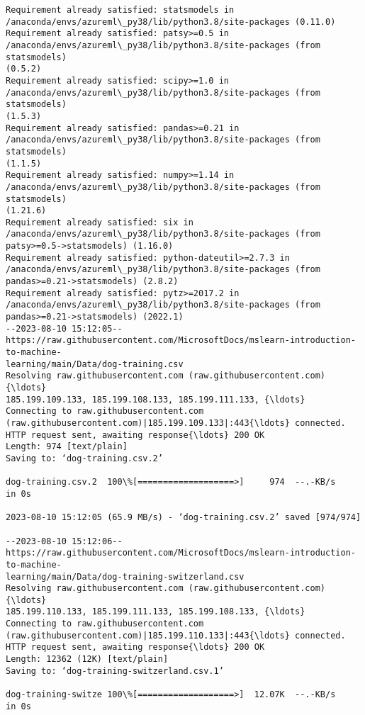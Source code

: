 \documentclass[11pt]{article}
\begin{document}
    \begin{Verbatim}[commandchars=\\\{\}]
Requirement already satisfied: statsmodels in
/anaconda/envs/azureml\_py38/lib/python3.8/site-packages (0.11.0)
Requirement already satisfied: patsy>=0.5 in
/anaconda/envs/azureml\_py38/lib/python3.8/site-packages (from statsmodels)
(0.5.2)
Requirement already satisfied: scipy>=1.0 in
/anaconda/envs/azureml\_py38/lib/python3.8/site-packages (from statsmodels)
(1.5.3)
Requirement already satisfied: pandas>=0.21 in
/anaconda/envs/azureml\_py38/lib/python3.8/site-packages (from statsmodels)
(1.1.5)
Requirement already satisfied: numpy>=1.14 in
/anaconda/envs/azureml\_py38/lib/python3.8/site-packages (from statsmodels)
(1.21.6)
Requirement already satisfied: six in
/anaconda/envs/azureml\_py38/lib/python3.8/site-packages (from
patsy>=0.5->statsmodels) (1.16.0)
Requirement already satisfied: python-dateutil>=2.7.3 in
/anaconda/envs/azureml\_py38/lib/python3.8/site-packages (from
pandas>=0.21->statsmodels) (2.8.2)
Requirement already satisfied: pytz>=2017.2 in
/anaconda/envs/azureml\_py38/lib/python3.8/site-packages (from
pandas>=0.21->statsmodels) (2022.1)
--2023-08-10 15:12:05--
https://raw.githubusercontent.com/MicrosoftDocs/mslearn-introduction-to-machine-
learning/main/Data/dog-training.csv
Resolving raw.githubusercontent.com (raw.githubusercontent.com){\ldots}
185.199.109.133, 185.199.108.133, 185.199.111.133, {\ldots}
Connecting to raw.githubusercontent.com
(raw.githubusercontent.com)|185.199.109.133|:443{\ldots} connected.
HTTP request sent, awaiting response{\ldots} 200 OK
Length: 974 [text/plain]
Saving to: ‘dog-training.csv.2’

dog-training.csv.2  100\%[===================>]     974  --.-KB/s    in 0s

2023-08-10 15:12:05 (65.9 MB/s) - ‘dog-training.csv.2’ saved [974/974]

--2023-08-10 15:12:06--
https://raw.githubusercontent.com/MicrosoftDocs/mslearn-introduction-to-machine-
learning/main/Data/dog-training-switzerland.csv
Resolving raw.githubusercontent.com (raw.githubusercontent.com){\ldots}
185.199.110.133, 185.199.111.133, 185.199.108.133, {\ldots}
Connecting to raw.githubusercontent.com
(raw.githubusercontent.com)|185.199.110.133|:443{\ldots} connected.
HTTP request sent, awaiting response{\ldots} 200 OK
Length: 12362 (12K) [text/plain]
Saving to: ‘dog-training-switzerland.csv.1’

dog-training-switze 100\%[===================>]  12.07K  --.-KB/s    in 0s


\end{Verbatim}
\end{document}
